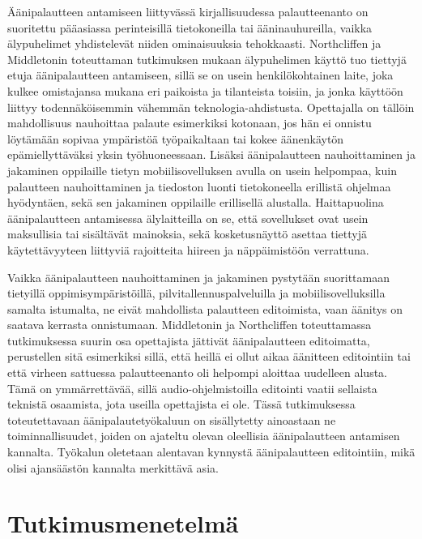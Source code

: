 \documentclass[utf8]{gradu3}
\begin{document}
Äänipalautteen antamiseen liittyvässä kirjallisuudessa palautteenanto on suoritettu pääasiassa perinteisillä tietokoneilla tai ääninauhureilla, vaikka älypuhelimet yhdistelevät niiden ominaisuuksia tehokkaasti. Northcliffen ja Middletonin \parencite{smartphone} toteuttaman tutkimuksen mukaan älypuhelimen käyttö tuo tiettyjä etuja äänipalautteen antamiseen, sillä se on usein henkilökohtainen laite, joka kulkee omistajansa mukana eri paikoista ja tilanteista toisiin, ja jonka käyttöön liittyy todennäköisemmin vähemmän teknologia-ahdistusta. Opettajalla on tällöin mahdollisuus nauhoittaa palaute esimerkiksi kotonaan, jos hän ei onnistu löytämään sopivaa ympäristöä työpaikaltaan tai kokee äänenkäytön epämiellyttäväksi yksin työhuoneessaan. Lisäksi äänipalautteen nauhoittaminen ja jakaminen oppilaille tietyn mobiilisovelluksen avulla on usein helpompaa, kuin palautteen nauhoittaminen ja tiedoston luonti tietokoneella erillistä ohjelmaa hyödyntäen, sekä sen jakaminen oppilaille erillisellä alustalla. Haittapuolina äänipalautteen antamisessa älylaitteilla on se, että sovellukset ovat usein maksullisia tai sisältävät mainoksia, sekä kosketusnäyttö asettaa tiettyjä käytettävyyteen liittyviä rajoitteita hiireen ja näppäimistöön verrattuna.

Vaikka äänipalautteen nauhoittaminen ja jakaminen pystytään suorittamaan tietyillä oppimisympäristöillä, pilvitallennuspalveluilla ja mobiilisovelluksilla samalta istumalta, ne eivät mahdollista palautteen editoimista, vaan äänitys on saatava kerrasta onnistumaan. Middletonin ja Northcliffen \parencite{principles} toteuttamassa tutkimuksessa suurin osa opettajista jättivät äänipalautteen editoimatta, perustellen sitä esimerkiksi sillä, että heillä ei ollut aikaa äänitteen editointiin tai että virheen sattuessa palautteenanto oli helpompi aloittaa uudelleen alusta. Tämä on ymmärrettävää, sillä audio-ohjelmistoilla editointi vaatii sellaista teknistä osaamista, jota useilla opettajista ei ole. Tässä tutkimuksessa toteutettavaan äänipalautetyökaluun on sisällytetty ainoastaan ne toiminnallisuudet, joiden on ajateltu olevan oleellisia äänipalautteen antamisen kannalta. Työkalun oletetaan alentavan kynnystä äänipalautteen editointiin, mikä olisi ajansäästön kannalta merkittävä asia.


%

\chapter{Tutkimusmenetelmä}
\end{document}

